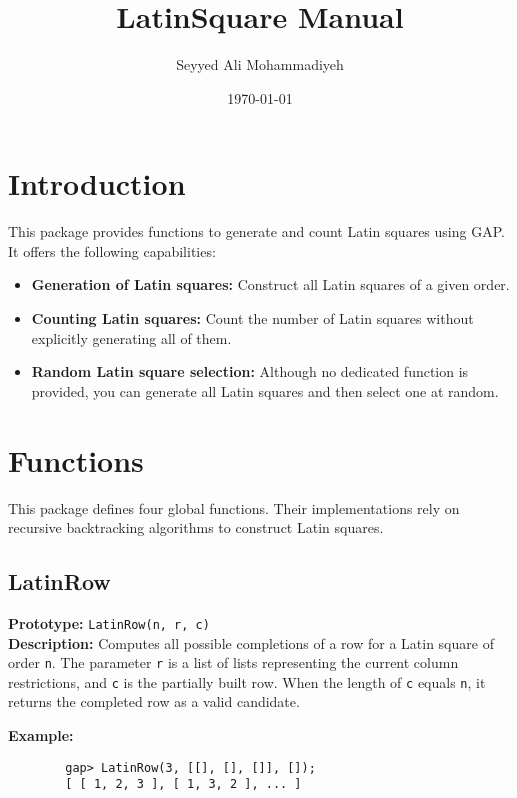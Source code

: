 \documentclass{report}
\title{LatinSquare Manual}
\author{Seyyed Ali Mohammadiyeh}
\date{\today}
\begin{document}
	
	\maketitle
	\tableofcontents
	\clearpage
	
	\chapter{Introduction}
	This package provides functions to generate and count Latin squares using GAP. It offers the following capabilities:
	\begin{itemize}
		\item \textbf{Generation of Latin squares:} Construct all Latin squares of a given order.
		\item \textbf{Counting Latin squares:} Count the number of Latin squares without explicitly generating all of them.
		\item \textbf{Random Latin square selection:} Although no dedicated function is provided, you can generate all Latin squares and then select one at random.
	\end{itemize}
	
	\chapter{Functions}
	This package defines four global functions. Their implementations rely on recursive backtracking algorithms to construct Latin squares.
	
	\section{LatinRow}
	\textbf{Prototype:} \texttt{LatinRow(n, r, c)}\\[1mm]
	\textbf{Description:}  
	Computes all possible completions of a row for a Latin square of order \texttt{n}. The parameter \texttt{r} is a list of lists representing the current column restrictions, and \texttt{c} is the partially built row. When the length of \texttt{c} equals \texttt{n}, it returns the completed row as a valid candidate. 
	
	\textbf{Example:}
	\begin{lstlisting}
		gap> LatinRow(3, [[], [], []], []);
		[ [ 1, 2, 3 ], [ 1, 3, 2 ], ... ]
	\end{lstlisting}
	
\end{document}
